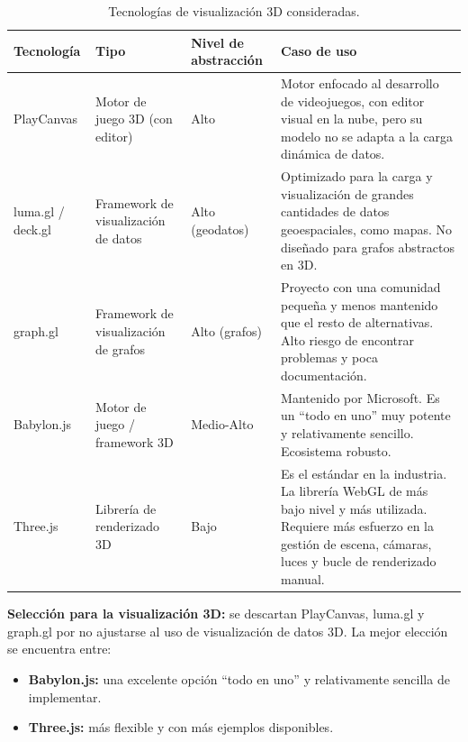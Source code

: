 \begin{table}[H]
	\centering
	\caption{Tecnologías de visualización 3D consideradas.}
	\small
	\begin{tabularx}{\textwidth}{>{\raggedright\arraybackslash}p{2.0cm} >{\raggedright\arraybackslash}p{2.4cm} >{\raggedright\arraybackslash}p{2.1cm} >{\raggedright\arraybackslash}X}
		\toprule
		\textbf{Tecnología} & \textbf{Tipo} & \textbf{Nivel de abstracción} & \textbf{Caso de uso} \\
		\midrule
		PlayCanvas & Motor de juego 3D (con editor) & Alto &
			Motor enfocado al desarrollo de videojuegos, con editor visual en la nube,
			pero su modelo no se adapta a la carga dinámica de datos. \\
		\addlinespace
		luma.gl / deck.gl & Framework de visualización de datos & Alto (geodatos) &
			Optimizado para la carga y visualización de grandes cantidades de datos
			geoespaciales, como mapas. No diseñado para grafos abstractos en 3D. \\
		\addlinespace
		graph.gl & Framework de visualización de grafos & Alto (grafos) &
			Proyecto con una comunidad pequeña y menos mantenido que el resto de
			alternativas. Alto riesgo de encontrar problemas y poca documentación. \\
		\addlinespace
		Babylon.js & Motor de juego / framework 3D & Medio-Alto &
			Mantenido por Microsoft. Es un ``todo en uno'' muy potente y
			relativamente sencillo. Ecosistema robusto. \\
		\addlinespace
		Three.js & Librería de renderizado 3D & Bajo &
			Es el estándar en la industria. La librería WebGL de más bajo nivel y más
			utilizada. Requiere más esfuerzo en la gestión de escena, cámaras, luces y
			bucle de renderizado manual. \\
		\bottomrule
	\end{tabularx}
\end{table}

\textbf{Selección para la visualización 3D:} se descartan PlayCanvas, luma.gl y graph.gl por
no ajustarse al uso de visualización de datos 3D. La mejor elección se encuentra entre:

\begin{itemize}
	\item \textbf{Babylon.js:} una excelente opción ``todo en uno'' y relativamente sencilla de
		implementar.
	\item \textbf{Three.js:} más flexible y con más ejemplos disponibles.
\end{itemize}

